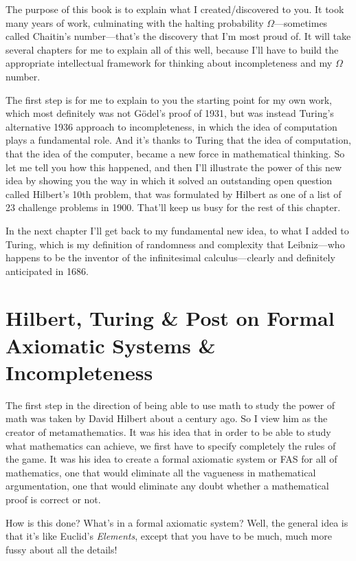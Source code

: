 \documentclass[12pt]{book}
\begin{document}
The purpose of this book is to explain what I created/discovered to you. 
It took many years of work, culminating with 
the halting probability $\Omega$---sometimes called Chaitin's number---that's
the discovery that I'm most proud of.
It will take several chapters for me to explain all of this well, 
because I'll have 
to build the appropriate intellectual
framework for thinking about incompleteness and my $\Omega$ number.

The first step is for me to explain to you the starting point for my own work, which most
definitely was not G\"odel's proof of 1931, but was instead Turing's alternative 1936 approach to
incompleteness, in which the idea of computation plays a fundamental role.
And it's thanks to Turing that the idea of computation, that the idea of the computer, became
a new force in mathematical thinking.  So let me tell you how this happened, and then I'll illustrate
the power of this new idea by showing you the way in which it solved an outstanding open 
question called
Hilbert's 10th problem, that was formulated by Hilbert as one of a list of 23 challenge 
problems in 1900.
That'll keep us busy for the rest of this chapter.

In the next chapter I'll get back to my fundamental new idea, to what I added to Turing,
which is my definition of randomness and complexity that Leibniz---who happens to be the inventor of
the infinitesimal calculus---clearly and definitely anticipated in 1686.

\section*{Hilbert, Turing \& Post on Formal Axiomatic Systems \& Incompleteness}

The first step in the direction of being able to use math to study the power of math
was taken by David Hilbert about a century ago.  
So I view him as the creator of metamathematics.
It was his idea that in order to be able to study
what mathematics can achieve, we first have to specify completely the rules of the game.
It was his idea to create a formal axiomatic system or FAS for all of mathematics, one that
would eliminate all the vagueness in mathematical argumentation,
one that would eliminate any doubt whether a mathematical proof is correct or not.

How is this done?  What's in a formal axiomatic system?
Well, the general idea is that it's like Euclid's \emph{Elements}, except that you have
to be much, much more fussy about all the details!
\end{document}
